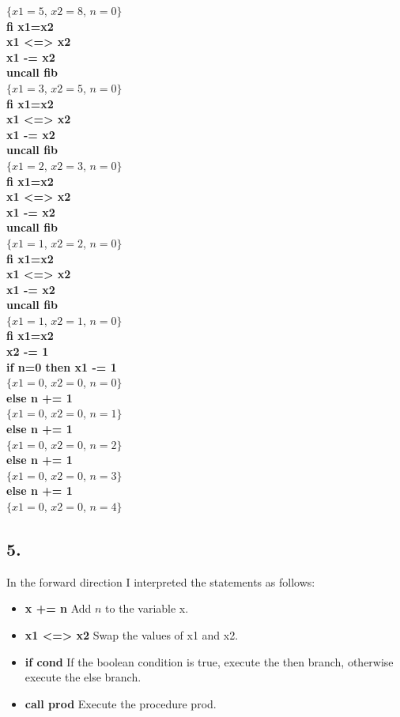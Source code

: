 \documentclass[12pt]{report}
\begin{document}
$ \{x1=5$, $x2=8$, $n=0 \} $ \\
\textbf{fi x1=x2} \\
\textbf{x1 <=> x2} \\
\textbf{x1 -= x2} \\
\textbf{uncall fib} \\
$ \{x1=3$, $x2=5$, $n=0 \} $ \\
\textbf{fi x1=x2} \\
\textbf{x1 <=> x2} \\
\textbf{x1 -= x2} \\
\textbf{uncall fib} \\
$ \{x1=2$, $x2=3$, $n=0 \} $ \\
\textbf{fi x1=x2} \\
\textbf{x1 <=> x2} \\
\textbf{x1 -= x2} \\
\textbf{uncall fib} \\
$ \{x1=1$, $x2=2$, $n=0 \} $ \\
\textbf{fi x1=x2} \\
\textbf{x1 <=> x2} \\
\textbf{x1 -= x2} \\
\textbf{uncall fib} \\
$ \{x1=1$, $x2=1$, $n=0 \} $ \\
\textbf{fi x1=x2} \\
\textbf{x2 -= 1} \\
\textbf{if n=0 then x1 -= 1} \\
$ \{x1=0$, $x2=0$, $n=0 \} $ \\
\textbf{else n += 1} \\
$ \{x1=0$, $x2=0$, $n=1 \} $ \\
\textbf{else n += 1} \\
$ \{x1=0$, $x2=0$, $n=2 \} $ \\
\textbf{else n += 1} \\
$ \{x1=0$, $x2=0$, $n=3 \} $ \\
\textbf{else n += 1} \\
$ \{x1=0$, $x2=0$, $n=4 \} $ \\


\subsection*{5.}
In the forward direction I interpreted the statements as follows:
\begin{itemize}
\item \textbf{ x += n } Add $n$ to the variable x.
\item \textbf{ x1 <=> x2 } Swap the values of x1 and x2.
\item \textbf{ if cond } If the boolean condition is true, execute the then branch, otherwise execute the else branch.
\item \textbf{ call prod } Execute the procedure prod.
\end{itemize}
\end{document}
